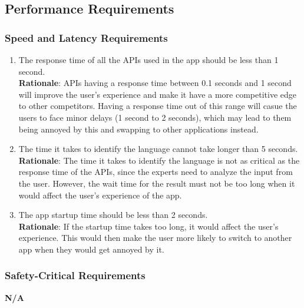 
\subsection{Performance Requirements}
\label{sub:performance_requirements}

\subsubsection{Speed and Latency Requirements}
\label{ssub:speed_and_latency_requirements}
\begin{enumerate}[{PR-SL}1. ]
	\item The response time of all the APIs used in the app should be less than 1 second.
	\\ \textbf{Rationale}: APIs having a response time between 0.1 seconds and 1 second will improve the user's experience and make it have a more competitive edge to other competitors. Having a response time out of this range will casue the users to face minor delays (1 second to 2 seconds), which may lead to them being annoyed by this and swapping to other applications instead.
	\item The time it takes to identify the language cannot take longer than 5 seconds.
	\\ \textbf{Rationale}: The time it takes to identify the language is not as critical as the response time of the APIs, since the experts need to analyze the input from the user. However, the wait time for the result must not be too long when it would affect the user's experience of the app.
	\item The app startup time should be less than 2 seconds.
	\\ \textbf{Rationale}: If the startup time takes too long, it would affect the user's experience. This would then make the user more likely to switch to another app when they would get annoyed by it.
\end{enumerate}


\subsubsection{Safety-Critical Requirements}
\label{ssub:safety_critical_requirements}
	\textbf{N/A}

